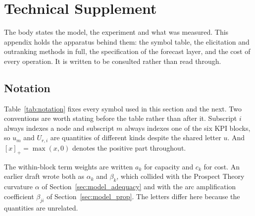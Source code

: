 \section{Technical Supplement}
\label{app:technical}

The body states the model, the experiment and what was measured. This appendix
holds the apparatus behind them: the symbol table, the elicitation and outranking
methods in full, the specification of the forecast layer, and the cost of every
operation. It is written to be consulted rather than read through.


\subsection{Notation}
\label{sec:model_notation}

Table~\ref{tab:notation} fixes every symbol used in this section and the next. Two
conventions are worth stating before the table rather than after it. Subscript $i$ always
indexes a node and subscript $m$ always indexes one of the six KPI blocks, so
$u_{m}$ and $U_{r,i}$ are quantities of different kinds despite the shared letter $u$.
And $[x]_+ = \max(x,0)$ denotes the positive part throughout.

The within-block term weights are written $a_k$ for capacity and $c_k$ for cost.
An earlier draft wrote both as $\alpha_k$ and $\beta_k$, which collided with the
Prospect Theory curvature $\alpha$ of Section~\ref{sec:model_adequacy} and with the arc
amplification coefficient $\beta_{ji}$ of Section~\ref{sec:model_prop}. The letters differ
here because the quantities are unrelated.

